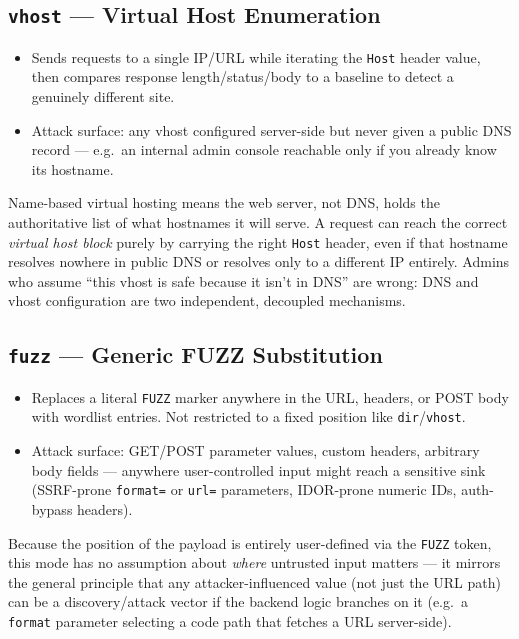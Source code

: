 \documentclass[11pt]{article}
\begin{document}
\subsection{\texttt{vhost} --- Virtual Host Enumeration}
\begin{itemize}
    \item Sends requests to a single IP/URL while iterating the \texttt{Host} header value, then compares response length/status/body to a baseline to detect a genuinely different site.
    \item Attack surface: any vhost configured server-side but never given a public DNS record --- e.g.\ an internal admin console reachable only if you already know its hostname.
\end{itemize}
\begin{causebox}
Name-based virtual hosting means the web server, not DNS, holds the authoritative list of what hostnames it will serve. A request can reach the correct \emph{virtual host block} purely by carrying the right \texttt{Host} header, even if that hostname resolves nowhere in public DNS or resolves only to a different IP entirely. Admins who assume ``this vhost is safe because it isn't in DNS'' are wrong: DNS and vhost configuration are two independent, decoupled mechanisms.
\end{causebox}

\subsection{\texttt{fuzz} --- Generic FUZZ Substitution}
\begin{itemize}
    \item Replaces a literal \texttt{FUZZ} marker anywhere in the URL, headers, or POST body with wordlist entries. Not restricted to a fixed position like \texttt{dir}/\texttt{vhost}.
    \item Attack surface: GET/POST parameter values, custom headers, arbitrary body fields --- anywhere user-controlled input might reach a sensitive sink (SSRF-prone \texttt{format=} or \texttt{url=} parameters, IDOR-prone numeric IDs, auth-bypass headers).
\end{itemize}
\begin{causebox}
Because the position of the payload is entirely user-defined via the \texttt{FUZZ} token, this mode has no assumption about \emph{where} untrusted input matters --- it mirrors the general principle that any attacker-influenced value (not just the URL path) can be a discovery/attack vector if the backend logic branches on it (e.g.\ a \texttt{format} parameter selecting a code path that fetches a URL server-side).
\end{causebox}
\end{document}
